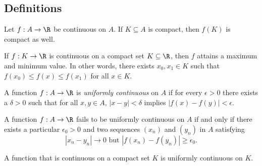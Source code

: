 \subsection{Definitions}


\begin{tcolorbox}
    \begin{thm}
    Let \( f: A \to \R  \) be continuous on \( A  \). If \( K \subseteq A  \) is compact, then \( f(K)  \) is compact as well.
    \end{thm}
\end{tcolorbox}


\begin{tcolorbox}
    \begin{thm}
    If \( f: K \to \R  \) is continuous on a compact set \( K \subseteq \R  \), then \( f  \) attains a maximum and minimum value. In other words, there exists \( x_0, x_1 \in K  \) such that \( f(x_0) \leq f(x) \leq f(x_1) \) for all \( x \in K  \).
    \end{thm}
\end{tcolorbox}

\begin{tcolorbox}
\begin{defn}
A function \( f: A \to \R  \) is \textit{uniformly continuous} on \( A  \) if for every \( \epsilon > 0  \) there exists a \( \delta > 0  \) such that for all \( x,y \in A  \), \( | x - y  | < \delta  \) implies \( | f(x) - f(y) | < \epsilon. \)
\end{defn}
\end{tcolorbox}

\begin{tcolorbox}
    \begin{thm}
    A function \( f: A \to \R  \) fails to be uniformly continuous on \( A  \) if and only if there exists a particular \( \epsilon_0 > 0  \) and two sequences \( (x_n) \) and \( (y_n) \) in \( A  \) satisfying 
    \[ | x_n - y_n  | \to 0 \text{~but~} | f(x_n) - f(y_n) | \geq \epsilon_0. \]
    \end{thm}
\end{tcolorbox}

\begin{tcolorbox}
    \begin{thm}
    A function that is continuous on a compact set \( K  \) is uniformly continuous on \( K \).
    \end{thm}
\end{tcolorbox}
